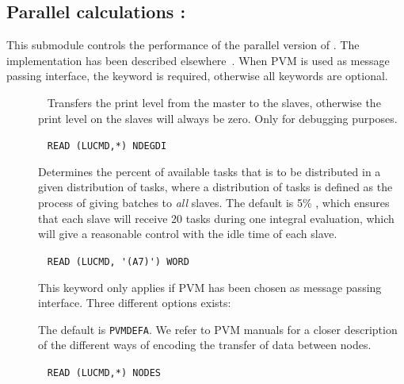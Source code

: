 \subsection{Parallel calculations : }

This submodule controls the performance of the parallel
version
of \siraba . The implementation has been described
elsewhere~\cite{pndjhapdkrthhkcpl253}. When PVM is used as
message passing interface, the
keyword  is required, otherwise all keywords are
optional.

\begin{description}

\item[]\verb| |
Transfers the print level from the master
to the slaves, otherwise the print level on the slaves will always be
zero. Only for debugging purposes.

\item[]\verb| |\newline
\verb|READ (LUCMD,*) NDEGDI|

Determines the percent of available tasks that
is to be distributed in
a given distribution of tasks, where a distribution of tasks is defined
as the process of giving batches to {\em all} slaves. The default is
5\% , which ensures that each slave will receive 20 tasks during one
integral evaluation, which will give a reasonable control with the
idle time of each slave.

\item[]\verb| |\newline
\verb|READ (LUCMD, '(A7)') WORD|

This keyword only applies if PVM has been chosen as message passing
interface. Three different options exists:


The default is \verb|PVMDEFA|. We refer to PVM manuals for a
closer description of the different ways of encoding the transfer of
data between nodes.

\item[]\verb| |\newline
\verb|READ (LUCMD,*) NODES|


\end{description}
